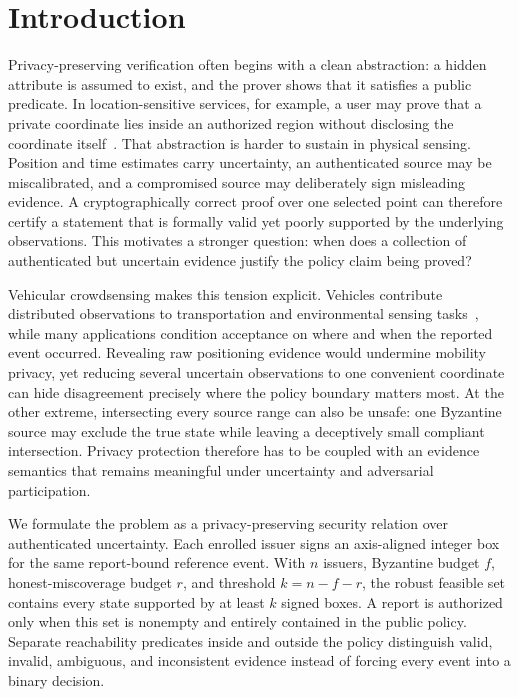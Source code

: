 \documentclass[preprint,review,12pt]{elsarticle}
\begin{document}
\section{Introduction}
Privacy-preserving verification often begins with a clean abstraction: a hidden attribute is assumed to exist, and the prover shows that it satisfies a public predicate. In location-sensitive services, for example, a user may prove that a private coordinate lies inside an authorized region without disclosing the coordinate itself~\cite{ZKLP,VehiclePolicy}. That abstraction is harder to sustain in physical sensing. Position and time estimates carry uncertainty, an authenticated source may be miscalibrated, and a compromised source may deliberately sign misleading evidence. A cryptographically correct proof over one selected point can therefore certify a statement that is formally valid yet poorly supported by the underlying observations. This motivates a stronger question: when does a collection of authenticated but uncertain evidence justify the policy claim being proved?

Vehicular crowdsensing makes this tension explicit. Vehicles contribute distributed observations to transportation and environmental sensing tasks~\cite{Suhag2023,Zheng2025BARM}, while many applications condition acceptance on where and when the reported event occurred. Revealing raw positioning evidence would undermine mobility privacy, yet reducing several uncertain observations to one convenient coordinate can hide disagreement precisely where the policy boundary matters most. At the other extreme, intersecting every source range can also be unsafe: one Byzantine source may exclude the true state while leaving a deceptively small compliant intersection. Privacy protection therefore has to be coupled with an evidence semantics that remains meaningful under uncertainty and adversarial participation.

We formulate the problem as a privacy-preserving security relation over authenticated uncertainty. Each enrolled issuer signs an axis-aligned integer box for the same report-bound reference event. With $n$ issuers, Byzantine budget $f$, honest-miscoverage budget $r$, and threshold $k=n-f-r$, the robust feasible set contains every state supported by at least $k$ signed boxes. A report is authorized only when this set is nonempty and entirely contained in the public policy. Separate reachability predicates inside and outside the policy distinguish valid, invalid, ambiguous, and inconsistent evidence instead of forcing every event into a binary decision.
\end{document}

